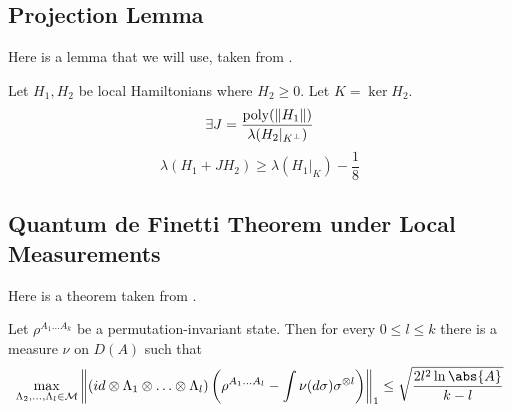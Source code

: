 \subsection{Projection Lemma}

Here is a lemma that we will use, taken from \cite{kempe_kitaev_regev_2006}.
\begin{theorem}
	Let $H_1, H_2$ be local Hamiltonians where $H_2\geq0$. Let $K=\ker H_2$.
	$$\exists J=\frac{\operatorname*{\operatorname{poly}}(\left\lVert H_1\right\rVert)}{\lambda(H_2|_{K^\bot})}$$
	$$\lambda(H_1+JH_2)\geq\lambda(H_1\big|_K)-\frac{1}{8}$$
\end{theorem}

\subsection{Quantum de Finetti Theorem under Local Measurements}

Here is a theorem taken from \cite{Brandão2017}.
\begin{theorem}
	\label{deFinetti}
	Let $\rho^{A_1\ldots A_k}$ be a permutation-invariant state. Then for every $0\leq l\leq k$ there is a measure $\nu$ on $D(A)$ such that
	$$\max_{\Lambda_2,\ldots,\Lambda_l\in\mathcal{M}}\norm{(id\otimes\Lambda_1\otimes\ldots\otimes\Lambda_l)\left(\rho^{A_1\ldots A_l}-\int \nu(d\sigma)\sigma^{\otimes l}\right)}_1\leq\sqrt{\frac{2l^2\ln\abs{A}}{k-l}}$$
\end{theorem}

